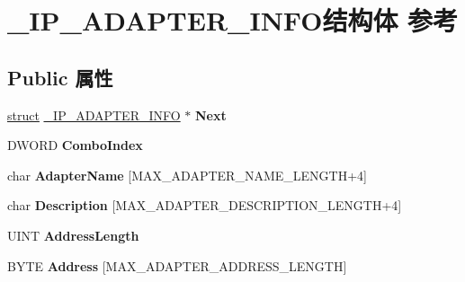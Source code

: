 \hypertarget{struct___i_p___a_d_a_p_t_e_r___i_n_f_o}{}\section{\+\_\+\+I\+P\+\_\+\+A\+D\+A\+P\+T\+E\+R\+\_\+\+I\+N\+F\+O结构体 参考}
\label{struct___i_p___a_d_a_p_t_e_r___i_n_f_o}
\subsection*{Public 属性}
\begin{DoxyCompactItemize}
\item 
\mbox{\label{struct___i_p___a_d_a_p_t_e_r___i_n_f_o_aab0bd8f30dc8af1f319452e5e0039ebf}} 
\hyperlink{interfacestruct}{struct} \hyperlink{struct___i_p___a_d_a_p_t_e_r___i_n_f_o}{\+\_\+\+I\+P\+\_\+\+A\+D\+A\+P\+T\+E\+R\+\_\+\+I\+N\+FO} $\ast$ {\bfseries Next}
\item 
\mbox{\label{struct___i_p___a_d_a_p_t_e_r___i_n_f_o_a226437fb4e743f9f91d340d0c069e893}} 
D\+W\+O\+RD {\bfseries Combo\+Index}
\item 
\mbox{\label{struct___i_p___a_d_a_p_t_e_r___i_n_f_o_a88cc1875abf89639549a112a21fb5336}} 
char {\bfseries Adapter\+Name} \mbox{[}M\+A\+X\+\_\+\+A\+D\+A\+P\+T\+E\+R\+\_\+\+N\+A\+M\+E\+\_\+\+L\+E\+N\+G\+TH+4\mbox{]}
\item 
\mbox{\label{struct___i_p___a_d_a_p_t_e_r___i_n_f_o_ab36b196626db1990d3055ad4d96ff8da}} 
char {\bfseries Description} \mbox{[}M\+A\+X\+\_\+\+A\+D\+A\+P\+T\+E\+R\+\_\+\+D\+E\+S\+C\+R\+I\+P\+T\+I\+O\+N\+\_\+\+L\+E\+N\+G\+TH+4\mbox{]}
\item 
\mbox{\label{struct___i_p___a_d_a_p_t_e_r___i_n_f_o_ab3190c9d8d99298714eb341f005b5538}} 
U\+I\+NT {\bfseries Address\+Length}
\item 
\mbox{\label{struct___i_p___a_d_a_p_t_e_r___i_n_f_o_a205c98af3f1578ee8ffe9ca552130056}} 
B\+Y\+TE {\bfseries Address} \mbox{[}M\+A\+X\+\_\+\+A\+D\+A\+P\+T\+E\+R\+\_\+\+A\+D\+D\+R\+E\+S\+S\+\_\+\+L\+E\+N\+G\+TH\mbox{]}

\end{DoxyCompactItemize}
